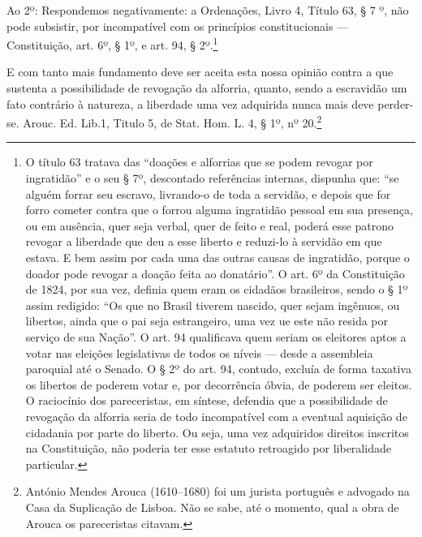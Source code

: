Ao 2º: Respondemos negativamente: a Ordenações, Livro 4,
Título 63, § 7 º, não pode subsistir, por incompatível com os
princípios constitucionais --- Constituição, art. 6º, § 1º, e art.
94, § 2º.\footnote{O título 63 tratava das ``doações e alforrias que se
  podem revogar por ingratidão'' e o seu § 7º, descontado referências
  internas, dispunha que: ``se alguém forrar seu escravo, livrando-o de
  toda a servidão, e depois que for forro cometer contra que o forrou
  alguma ingratidão pessoal em sua presença, ou em ausência, quer seja
  verbal, quer de feito e real, poderá esse patrono revogar a liberdade
  que deu a esse liberto e reduzi-lo à servidão em que estava. E bem
  assim por cada uma das outras causas de ingratidão, porque o doador
  pode revogar a doação feita ao donatário''. O art. 6º da Constituição
  de 1824, por sua vez, definia quem eram os cidadãos brasileiros, sendo
  o § 1º assim redigido: ``Os que no Brasil tiverem nascido, quer sejam
  ingênuos, ou libertos, ainda que o pai seja estrangeiro, uma vez ue
  este não resida por serviço de sua Nação''. O art. 94 qualificava quem
  seriam os eleitores aptos a votar nas eleições legislativas de todos
  os níveis --- desde a assembleia paroquial até o Senado. O § 2º do art.
  94, contudo, excluía de forma taxativa os libertos de poderem votar e,
  por decorrência óbvia, de poderem ser eleitos. O raciocínio dos
  pareceristas, em síntese, defendia que a possibilidade de revogação da
  alforria seria de todo incompatível com a eventual aquisição de
  cidadania por parte do liberto. Ou seja, uma vez adquiridos direitos
  inscritos na Constituição, não poderia ter esse estatuto retroagido
  por liberalidade particular.}

E com tanto mais fundamento deve ser aceita esta nossa opinião contra a
que sustenta a possibilidade de revogação da alforria, quanto, sendo a
escravidão um fato contrário à natureza, a liberdade uma vez adquirida
nunca mais deve perder-se. Arouc. Ed. Lib.1, Titulo 5, de Stat.
Hom. L. 4, § 1º, nº 20.\footnote{António Mendes Arouca (1610--1680) foi
  um jurista português e advogado na Casa da Suplicação de Lisboa. Não
  se sabe, até o momento, qual a obra de Arouca os pareceristas citavam.}

